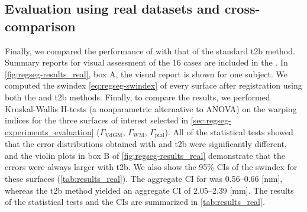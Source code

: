 \subsection{Evaluation using real datasets and cross-comparison}\label{sec:regseg-results_hcp}
Finally, we compared the performance of \regseg{} with that of the standard \gls*{t2b}
  method.
Summary reports for visual assessment of the 16 cases are included in the
  .
In \autoref{fig:regseg-results_real}, box A, the visual report is shown for one subject.
We computed the \gls*{swindex} \eqref{eq:regseg-swindex} of every surface after registration
  using both the \regseg{} and \gls*{t2b} methods.
Finally, to compare the results, we performed Kruskal-Wallis H-tests
  (a nonparametric alternative to ANOVA) on the warping indices for the three surfaces of
  interest selected in \autoref{sec:regseg-experiments_evaluation}
  ($\Gamma_\text{VdGM}$, $\Gamma_\text{WM}$, $\Gamma_\text{pial}$).
All of the statistical tests showed that the error distributions obtained with \regseg{} and
  \gls*{t2b} were significantly different, and the violin plots in box B of
  \autoref{fig:regseg-results_real} demonstrate that the errors were always larger with \gls*{t2b}.
We also show the 95\% CIs of the \gls*{swindex} for these surfaces 
  (\autoref{tab:results_real}).
The aggregate CI for \regseg{} was 0.56--0.66 [mm], whereas the \gls*{t2b} method
  yielded an aggregate CI of 2.05--2.39 [mm].
The results of the statistical tests and the CIs are summarized in \autoref{tab:results_real}.

